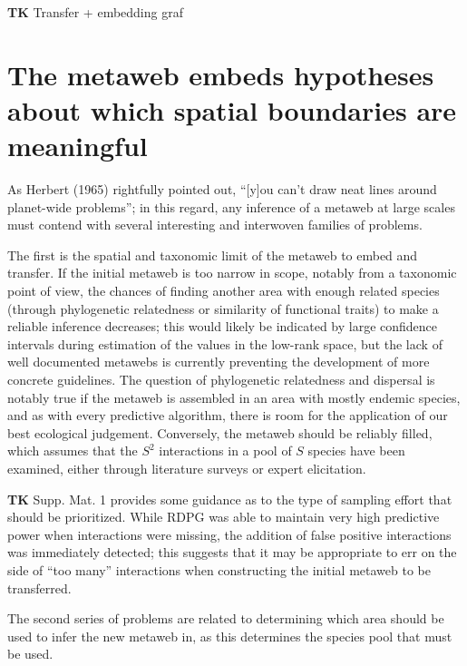 \documentclass[10pt,oneside]{article}
\begin{document}
\textbf{TK} Transfer + embedding graf

\hypertarget{the-metaweb-embeds-hypotheses-about-which-spatial-boundaries-are-meaningful}{%
\section{The metaweb embeds hypotheses about which spatial boundaries
are
meaningful}\label{the-metaweb-embeds-hypotheses-about-which-spatial-boundaries-are-meaningful}}

As Herbert (1965) rightfully pointed out, ``{[}y{]}ou can't draw neat
lines around planet-wide problems''; in this regard, any inference of a
metaweb at large scales must contend with several interesting and
interwoven families of problems.

The first is the spatial and taxonomic limit of the metaweb to embed and
transfer. If the initial metaweb is too narrow in scope, notably from a
taxonomic point of view, the chances of finding another area with enough
related species (through phylogenetic relatedness or similarity of
functional traits) to make a reliable inference decreases; this would
likely be indicated by large confidence intervals during estimation of
the values in the low-rank space, but the lack of well documented
metawebs is currently preventing the development of more concrete
guidelines. The question of phylogenetic relatedness and dispersal is
notably true if the metaweb is assembled in an area with mostly endemic
species, and as with every predictive algorithm, there is room for the
application of our best ecological judgement. Conversely, the metaweb
should be reliably filled, which assumes that the \(S^2\) interactions
in a pool of \(S\) species have been examined, either through literature
surveys or expert elicitation.

\textbf{TK} Supp. Mat. 1 provides some guidance as to the type of
sampling effort that should be prioritized. While RDPG was able to
maintain very high predictive power when interactions were missing, the
addition of false positive interactions was immediately detected; this
suggests that it may be appropriate to err on the side of ``too many''
interactions when constructing the initial metaweb to be transferred.

The second series of problems are related to determining which area
should be used to infer the new metaweb in, as this determines the
species pool that must be used.
\end{document}
